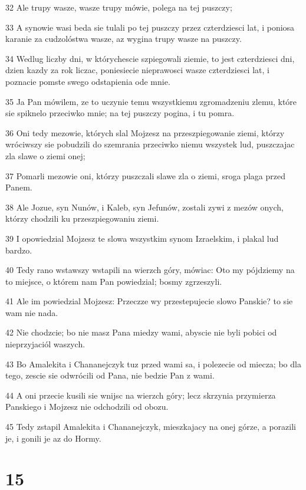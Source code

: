 \par 32 Ale trupy wasze, wasze trupy mówie, polega na tej puszczy;
\par 33 A synowie wasi beda sie tulali po tej puszczy przez czterdziesci lat, i poniosa karanie za cudzolóstwa wasze, az wygina trupy wasze na puszczy.
\par 34 Wedlug liczby dni, w którychescie szpiegowali ziemie, to jest czterdziesci dni, dzien kazdy za rok liczac, poniesiecie nieprawosci wasze czterdziesci lat, i poznacie pomste swego odstapienia ode mnie.
\par 35 Ja Pan mówilem, ze to uczynie temu wszystkiemu zgromadzeniu zlemu, które sie spiknelo przeciwko mnie; na tej puszczy pogina, i tu pomra.
\par 36 Oni tedy mezowie, których slal Mojzesz na przeszpiegowanie ziemi, którzy wróciwszy sie pobudzili do szemrania przeciwko niemu wszystek lud, puszczajac zla slawe o ziemi onej;
\par 37 Pomarli mezowie oni, którzy puszczali slawe zla o ziemi, sroga plaga przed Panem.
\par 38 Ale Jozue, syn Nunów, i Kaleb, syn Jefunów, zostali zywi z mezów onych, którzy chodzili ku przeszpiegowaniu ziemi.
\par 39 I opowiedzial Mojzesz te slowa wszystkim synom Izraelskim, i plakal lud bardzo.
\par 40 Tedy rano wstawszy wstapili na wierzch góry, mówiac: Oto my pójdziemy na to miejsce, o którem nam Pan powiedzial; bosmy zgrzeszyli.
\par 41 Ale im powiedzial Mojzesz: Przeczze wy przestepujecie slowo Panskie? to sie wam nie nada.
\par 42 Nie chodzcie; bo nie masz Pana miedzy wami, abyscie nie byli pobici od nieprzyjaciól waszych.
\par 43 Bo Amalekita i Chananejczyk tuz przed wami sa, i polezecie od miecza; bo dla tego, zescie sie odwrócili od Pana, nie bedzie Pan z wami.
\par 44 A oni przecie kusili sie wnijsc na wierzch góry; lecz skrzynia przymierza Panskiego i Mojzesz nie odchodzili od obozu.
\par 45 Tedy zstapil Amalekita i Chananejczyk, mieszkajacy na onej górze, a porazili je, i gonili je az do Hormy.

\chapter{15}

